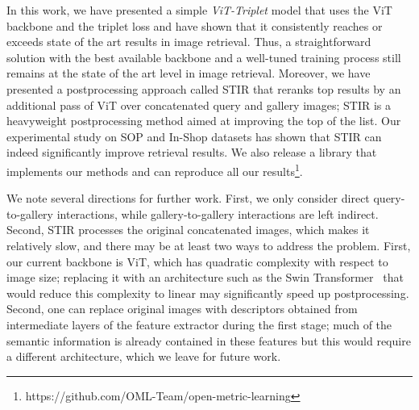 \documentclass{article}
\begin{document}
In this work, we have presented a simple \emph{ViT-Triplet} model that uses the ViT backbone and the triplet loss and have shown that it consistently reaches or exceeds state of the art results in image retrieval. Thus, a straightforward solution with the best available backbone and a well-tuned training process still remains at the state of the art level in image retrieval.
Moreover, we have presented a postprocessing approach called STIR that reranks top results by an additional pass of ViT over concatenated query and gallery images; STIR is a heavyweight postprocessing method aimed at improving the top of the list. Our experimental study on SOP and In-Shop datasets has shown that STIR can indeed significantly improve retrieval results. We also release a library that implements our methods and can reproduce all our results\footnote{https://github.com/OML-Team/open-metric-learning}.

We note several directions for further work. First, we only consider direct query-to-gallery interactions, while gallery-to-gallery interactions are left indirect. Second, STIR processes the original concatenated images, which makes it relatively slow, and there may be at least two ways to address the problem. First, our current backbone is ViT, which has quadratic complexity with respect to image size; replacing it with an architecture such as the Swin Transformer~\cite{DBLP:journals/corr/abs-2103-14030} that would reduce this complexity to linear may significantly speed up postprocessing. Second, one can replace original images with descriptors obtained from intermediate layers of the feature extractor during the first stage; much of the semantic information is already contained in these features but this would require a different architecture, which we leave for future work.
\end{document}
